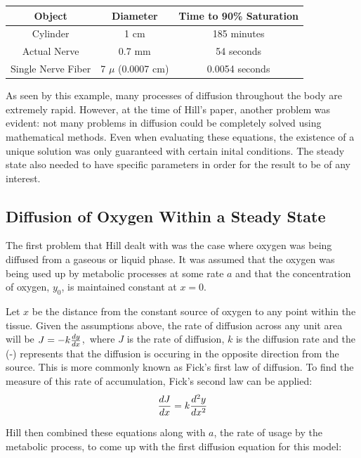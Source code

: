 \documentclass{article}
\begin{document}
\begin{tabular}{|c|c|c|}
    \hline
    Object             & Diameter            & Time to 90\% Saturation \\
    \hline
    Cylinder           & 1 cm                & 185 minutes             \\
    Actual Nerve       & 0.7 mm              & 54 seconds              \\
    Single Nerve Fiber & 7 $\mu$ (0.0007 cm) & 0.0054 seconds          \\
    \hline
\end{tabular}
\vspace*{1cm}

As seen by this example, many processes of diffusion throughout the body are extremely rapid. However, at the time of Hill's
paper, another problem was evident: not many problems in diffusion could be completely solved using mathematical methods.
Even when evaluating these equations, the existence of a unique solution was only guaranteed with certain inital conditions.
The steady state also needed to have specific parameters in order for the result to be of any interest.
\subsection{Diffusion of Oxygen Within a Steady State}

The first problem that Hill dealt with was the case where oxygen was being diffused from a gaseous or liquid phase.
It was assumed that the oxygen was being used up by metabolic processes at some rate $a$ and that the concentration
of oxygen, $y_0$, is maintained constant at $x = 0$.

\vspace*{0.5cm}

Let $x$ be the distance from the constant source of oxygen to any point within the tissue. Given the assumptions above,
the rate of diffusion across any unit area will be $ J = -k \* \frac{dy}{dx}$,\, where $J$ is the rate of diffusion, $k$ is the diffusion rate and the (-)
represents that the diffusion is occuring in the opposite direction from the source. This is more commonly known as Fick's
first law of diffusion. To find the measure of this rate of accumulation, Fick's second law can be applied:
\begin{equation}
    \frac{dJ}{dx} = k \* \frac{d^2y}{dx^2}
\end{equation}

Hill then combined these equations along with $a$, the rate of usage by the metabolic process, to come up with the first diffusion equation for
this model:
\end{document}
